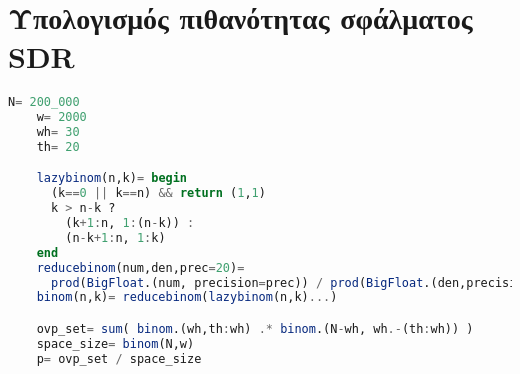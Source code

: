 \section*{Υπολογισμός πιθανότητας σφάλματος SDR} \label{app:sdr_fp}
  \begin{lstlisting}[language=julia]
    N= 200_000
    w= 2000
    wh= 30
    th= 20

    lazybinom(n,k)= begin
      (k==0 || k==n) && return (1,1)
      k > n-k ?
        (k+1:n, 1:(n-k)) :
        (n-k+1:n, 1:k)
    end
    reducebinom(num,den,prec=20)=
      prod(BigFloat.(num, precision=prec)) / prod(BigFloat.(den,precision=prec))
    binom(n,k)= reducebinom(lazybinom(n,k)...)

    ovp_set= sum( binom.(wh,th:wh) .* binom.(N-wh, wh.-(th:wh)) )
    space_size= binom(N,w)
    p= ovp_set / space_size
  \end{lstlisting}
